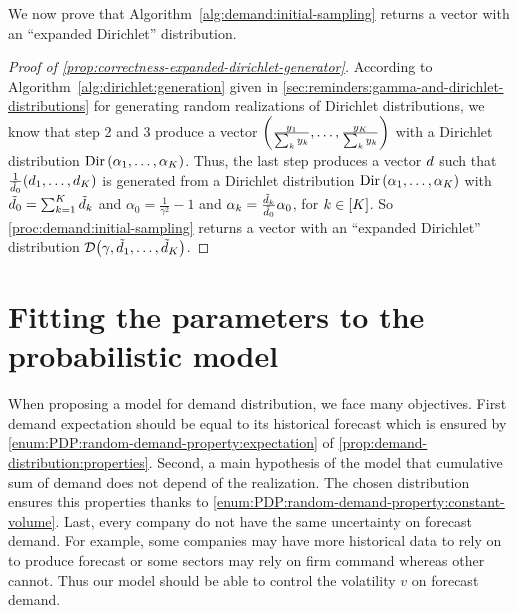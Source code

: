 We now prove that Algorithm~\ref{alg:demand:initial-sampling} returns a vector with an ``expanded Dirichlet'' distribution.


\begin{proof}[Proof of \cref{prop:correctness-expanded-dirichlet-generator}]
According to Algorithm~\ref{alg:dirichlet:generation} given in \cref{sec:reminders:gamma-and-dirichlet-distributions} for generating random realizations of Dirichlet distributions, we know that step 2 and 3 produce a vector $\bracket{\frac{y_1}{\sum_k y_k},\ldots,\frac{y_K}{\sum_k y_k}}$ with a Dirichlet distribution $\Dir\bracket{\alpha_1,\ldots,\alpha_K}$.
Thus, the last step produces a vector $d$ such that $\frac{1}{\tilde{\demand}_0}\bracket{\demand_1,\ldots,\demand_K}$ is generated from a Dirichlet distribution $\Dir\bracket{\alpha_1,\ldots,\alpha_K}$ with $\tilde{d}_0 = \sum_{k=1}^K\tilde{d}_k$ and $\alpha_0 = \frac{1}{\gamma^2}-1$ and $\alpha_k=\frac{\tilde{d}_k}{\tilde{d}_0}\alpha_0$, for $k\in\range{K}$.
So \cref{proc:demand:initial-sampling} returns a vector with an ``expanded Dirichlet'' distribution $\cD\bracket{\gamma,\tilde{\demand}_1,\ldots,\tilde{\demand}_K}$.
\end{proof}


\section{Fitting the parameters to the probabilistic model}
\label{sec:PDP:numerical-experiments:instances:fitting-parameters}


When proposing a model for demand distribution, we face many objectives.
First demand expectation should be equal to its historical forecast which is ensured by \cref{enum:PDP:random-demand-property:expectation} of \cref{prop:demand-distribution:properties}.
Second, a main hypothesis of the model that cumulative sum of demand does not depend of the realization.
The chosen distribution ensures this properties thanks to \cref{enum:PDP:random-demand-property:constant-volume}.
Last, every company do not have the same uncertainty on forecast demand.
For example, some companies may have more historical data to rely on to produce forecast or some sectors may rely on firm command whereas other cannot.
Thus our model should be able to control the volatility $v$ on forecast demand.


